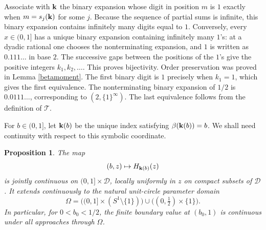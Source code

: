 \documentclass[12pt,a4paper]{amsart}
\makeatletter
\numberwithin{equation}{section}
\renewenvironment{proof}[1][Proof]{%
  \par\pushQED{\qed}%
  \normalfont\topsep6\p@\@plus6\p@\relax
  \trivlist
  \item[\hskip\labelsep\bfseries #1:]\ignorespaces
}{%
  \popQED\endtrivlist\@endpefalse
}
\theoremstyle{plain}
\newtheorem{prop}[Thm]{Proposition}
\theoremstyle{definition}
\makeatother
\begin{document}
\begin{proof}
Associate with ${\bf k}$ the binary expansion whose digit in position $m$ is $1$ exactly when $m=s_j({\bf k})$ for some $j$.  Because the sequence of partial sums is infinite, this binary expansion contains infinitely many digits equal to $1$.  Conversely, every $x\in(0,1]$ has a unique binary expansion containing infinitely many $1$'s: at a dyadic rational one chooses the nonterminating expansion, and $1$ is written as $0.111\ldots$ in base $2$.  The successive gaps between the positions of the $1$'s give the positive integers $k_1,k_2,\ldots$.  This proves bijectivity.  Order preservation was proved in Lemma \ref{betamoment}. The first binary digit is $1$ precisely when $k_1=1$, which gives the first equivalence.  The nonterminating binary expansion of $1/2$ is $0.0111\ldots$, corresponding to $(2,\{1\}^\infty)$.  The last equivalence follows from the definition of $\mathcal{T}$.
\end{proof}

For $b\in(0,1]$, let ${\bf k}(b)$ be the unique index satisfying
$\beta({\bf k}(b))=b$.  We shall need continuity with respect to this symbolic coordinate.

\begin{prop}\label{indexcontinuity}
The map
\[
(b,z)\mapsto H_{{\bf k}(b)}(z)
\]
is jointly continuous on $(0,1]\times\mathcal{D}$, locally uniformly in $z$ on compact subsets of $\mathcal{D}$.
It extends continuously to the natural unit-circle parameter domain
\[
\Omega=\big((0,1]\times(S^1\setminus\{1\})\big)
\cup\big((0,\tfrac12)\times\{1\}\big).
\]
In particular, for $0<b_0<1/2$, the finite boundary value at $(b_0,1)$ is continuous under all approaches through $\Omega$.
\end{prop}
\end{document}
